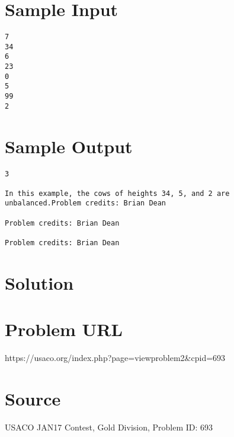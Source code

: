 \documentclass[12pt]{article}
\begin{document}
\section*{Sample Input}
\begin{verbatim}
7
34
6
23
0
5
99
2
\end{verbatim}

\section*{Sample Output}
\begin{verbatim}
3

In this example, the cows of heights 34, 5, and 2 are unbalanced.Problem credits: Brian Dean

Problem credits: Brian Dean

Problem credits: Brian Dean
\end{verbatim}

\section*{Solution}


\section*{Problem URL}
https://usaco.org/index.php?page=viewproblem2&cpid=693

\section*{Source}
USACO JAN17 Contest, Gold Division, Problem ID: 693
\end{document}
